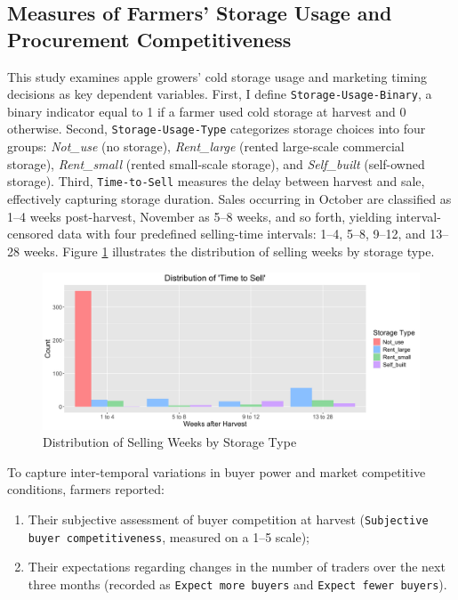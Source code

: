 \subsection{Measures of Farmers' Storage Usage and Procurement Competitiveness}
\noindent This study examines apple growers' cold storage usage and marketing timing decisions as key dependent variables. First, I define \texttt{Storage-Usage-Binary}, a binary indicator equal to 1 if a farmer used cold storage at harvest and 0 otherwise. Second, \texttt{Storage-Usage-Type} categorizes storage choices into four groups: \textit{Not\_use} (no storage), \textit{Rent\_large} (rented large-scale commercial storage), \textit{Rent\_small} (rented small-scale storage), and \textit{Self\_built} (self-owned storage). Third, \texttt{Time-to-Sell} measures the delay between harvest and sale, effectively capturing storage duration. Sales occurring in October are classified as 1–4 weeks post-harvest, November as 5–8 weeks, and so forth, yielding interval-censored data with four predefined selling-time intervals: 1–4, 5–8, 9–12, and 13–28 weeks. Figure \ref{Figure: selling weeks distribution} illustrates the distribution of selling weeks by storage type.  

\begin{figure}[H]
\centering
\includegraphics[width=1\textwidth]{figures/selling_weeks_distribution.png}
\caption{Distribution of Selling Weeks by Storage Type}
\label{Figure: selling weeks distribution}
\end{figure}

To capture inter-temporal variations in buyer power and market competitive conditions, farmers reported:
\begin{enumerate}
    \item Their subjective assessment of buyer competition at harvest (\texttt{Subjective buyer competitiveness}, measured on a 1–5 scale);
    \item Their expectations regarding changes in the number of traders over the next three months (recorded as \texttt{Expect more buyers} and \texttt{Expect fewer buyers}).
\end{enumerate}

